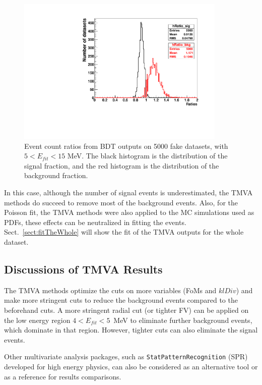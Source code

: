 \begin{figure}[!htb]
	\centering
	\includegraphics[width=10cm]{TMVAratios_fakedataset.pdf}
	\caption[Event count fractions from BDT outputs on 5000 fake datasets, with $5<E_{fit}<15$ MeV.]{Event count ratios from BDT outputs on 5000 fake datasets, with $5<E_{fit}<15$ MeV. The black histogram is the distribution of the signal fraction, and the red histogram is the distribution of the background fraction.\label{fig:TMVAfractions}}
\end{figure}

In this case, although the number of signal events is underestimated, the TMVA methods do succeed to remove most of the background events. Also, for the Poisson fit, the TMVA methods were also applied to the MC simulations used as PDFs, these effects can be neutralized in fitting the events. Sect.~\ref{sect:fitTheWhole} will show the fit of the TMVA outputs for the whole dataset. 

\subsection{Discussions of TMVA Results}

The TMVA methods optimize the cuts on more variables (FoMs and $klDiv$) and make more stringent cuts to reduce the background events compared to the beforehand cuts. A more stringent radial cut (or tighter FV) can be applied on the low energy region $4<E_{fit}<5$~MeV to eliminate further background events, which dominate in that region. However, tighter cuts can also eliminate the signal events.

Other multivariate analysis packages, such as \texttt{StatPatternRecognition} (SPR) \cite{sprWebsite} developed for high energy physics, can also be considered as an alternative tool or as a reference for results comparisons. 

